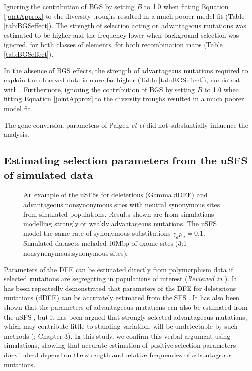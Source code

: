 \documentclass[11pt]{article}
\begin{document}
	Ignoring the contribution of BGS by setting $B$ to 1.0 when fitting Equation \ref{jointApprox} to the diversity troughs resulted in a much poorer model fit (Table \ref{tab:BGSeffect}). The strength of selection acting on advantageous mutations was estimated to be higher and the frequency lower when background selection was ignored, for both classes of elements, for both recombination maps (Table \ref{tab:BGSeffect}). 
	
	In the absence of BGS effects, the strength of advantageous mutations required to explain the observed data is more far higher (Table \ref{tab:BGSeffect}), consistant with \cite{RN290}. Furthermore, ignoring the contribution of BGS by setting $B$ to 1.0 when fitting Equation \ref{jointApprox} to the diversity troughs resulted in a much poorer model fit.  
	
	The gene conversion parameters of Paigen \textit{et al} did not substantially influence the analysis.
	





\subsection*{Estimating selection parameters from the uSFS of simulated data}

\linespread{1}

\begin{figure}[h]
   \centering      
   \noindent{}
 \caption{An example of the uSFSs for deleterious (Gamma dDFE) and advantageous nonsynonymous sites with neutral synonymous sites from simulated populations. Results shown are from simulations modelling strongly or weakly advantageous mutations. The uSFS  model the same rate of synonymous substitutions $\gamma_a p_a = 0.1$. Simulated datasets included 10Mbp of exonic sites (3:1 nonsynonymous:synonymous sites).}
 
 \label{fig:sfsExample}
\end{figure}
\linespread{1}

	Parameters of the DFE can be estimated directly from polymorphism data if selected mutations are segregating in populations of interest (\textit{Reviewed in} \citealt{RN109}). It has been repeatedly demonstrated that parameters of the DFE for deleterious mutations (dDFE) can be accurately estimated from the SFS \citep{RN201, RN164, RN178, RN354}. It has also been shown that the parameters of advantageous mutations can also be estimated from the uSFS \citep{RN210, RN354}, but it has been argued that strongly selected advantageous mutations, which may contribute little to standing variation, will be undetectable by such methods (\citealt{RN290}; Chapter 3). In this study, we confirm this verbal argument using simulations, showing that accurate estimation of positive selection parameters does indeed depend on the strength and relative frequencies of advantageous mutations.
\end{document}
